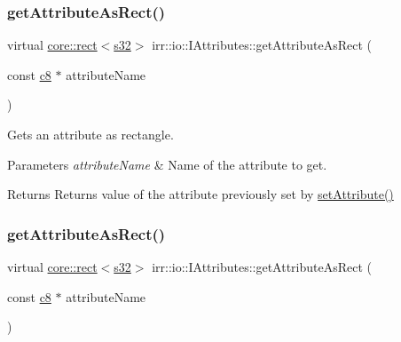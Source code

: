 \subsubsection{\texorpdfstring{get\+Attribute\+As\+Rect()}{getAttributeAsRect()}\hspace{0.1cm}{\footnotesize\ttfamily [1/4]}}
{\footnotesize\ttfamily virtual \hyperlink{classirr_1_1core_1_1rect}{core\+::rect}$<$\hyperlink{namespaceirr_ac66849b7a6ed16e30ebede579f9b47c6}{s32}$>$ irr\+::io\+::\+I\+Attributes\+::get\+Attribute\+As\+Rect (\begin{DoxyParamCaption}\item[{const \hyperlink{namespaceirr_a9395eaea339bcb546b319e9c96bf7410}{c8} $\ast$}]{attribute\+Name }\end{DoxyParamCaption})\hspace{0.3cm}{\ttfamily [pure virtual]}}



Gets an attribute as rectangle. 


\begin{DoxyParams}{Parameters}
{\em attribute\+Name} & Name of the attribute to get. \\
\hline
\end{DoxyParams}
\begin{DoxyReturn}{Returns}
Returns value of the attribute previously set by \hyperlink{classirr_1_1io_1_1IAttributes_a03fa31acb481ae23678676cc183f09a6}{set\+Attribute()} 
\end{DoxyReturn}
\mbox{\label{classirr_1_1io_1_1IAttributes_ac2d077105e2e7c263ea181f67a005cc2}} 
\subsubsection{\texorpdfstring{get\+Attribute\+As\+Rect()}{getAttributeAsRect()}\hspace{0.1cm}{\footnotesize\ttfamily [2/4]}}
{\footnotesize\ttfamily virtual \hyperlink{classirr_1_1core_1_1rect}{core\+::rect}$<$\hyperlink{namespaceirr_ac66849b7a6ed16e30ebede579f9b47c6}{s32}$>$ irr\+::io\+::\+I\+Attributes\+::get\+Attribute\+As\+Rect (\begin{DoxyParamCaption}\item[{const \hyperlink{namespaceirr_a9395eaea339bcb546b319e9c96bf7410}{c8} $\ast$}]{attribute\+Name }\end{DoxyParamCaption})\hspace{0.3cm}{\ttfamily [pure virtual]}}



